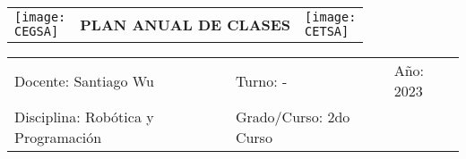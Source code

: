 \documentclass[landscape, a4paper, 10pt]{article}
\newcommand{\profesor}{Santiago Wu}
\newcommand{\discipline}{Robótica y Programación}
\newcommand{\currentyear}{2023}
\newcommand{\CEGSA}{cegsa-logo.png}
\newcommand{\CETSA}{cetsa-logo.png}
\begin{document}
	\pagebreak[4]
	\begin{tabularx}{\textwidth}{ >{\raggedright\arraybackslash}X >{\centering\arraybackslash}X >{\raggedleft\arraybackslash}X }
		\texttt{[image: \\CEGSA]} &
		\textbf{PLAN ANUAL DE CLASES} &
		\texttt{[image: \\CETSA]}
	\end{tabularx}
	\begin{tabularx}{\textwidth}{ >{\raggedright\arraybackslash}X >{\raggedright\arraybackslash}X >{\raggedright\arraybackslash}X }
		Docente: \profesor &
		Turno: - &
		Año: \currentyear \\
		Disciplina: \discipline &
		Grado/Curso: 2do Curso &
		 \\
	\end{tabularx}
	\centering
\end{document}

